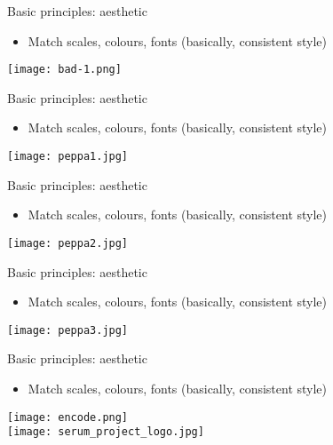 \documentclass[10pt]{beamer}
\begin{document}
\begin{frame}{Basic principles: aesthetic}
    \begin{itemize}
    \item Match scales, colours, fonts (basically, consistent style)
    \end{itemize}
    \texttt{[image: bad-1.png]}
\end{frame}
\begin{frame}{Basic principles: aesthetic}
    \begin{itemize}
    \item Match scales, colours, fonts (basically, consistent style)
    \end{itemize}
    \texttt{[image: peppa1.jpg]} \\
\end{frame}
\begin{frame}{Basic principles: aesthetic}
    \begin{itemize}
    \item Match scales, colours, fonts (basically, consistent style)
    \end{itemize}
    \texttt{[image: peppa2.jpg]} \\
\end{frame}\begin{frame}{Basic principles: aesthetic}
    \begin{itemize}
    \item Match scales, colours, fonts (basically, consistent style)
    \end{itemize}
    \texttt{[image: peppa3.jpg]} \\
\end{frame}
\begin{frame}{Basic principles: aesthetic}
    \begin{itemize}
    \item Match scales, colours, fonts (basically, consistent style)
    \end{itemize}
    \centering
        \texttt{[image: encode.png]} \\
    \texttt{[image: serum\_project\_logo.jpg]} \\
\end{frame}
\end{document}
